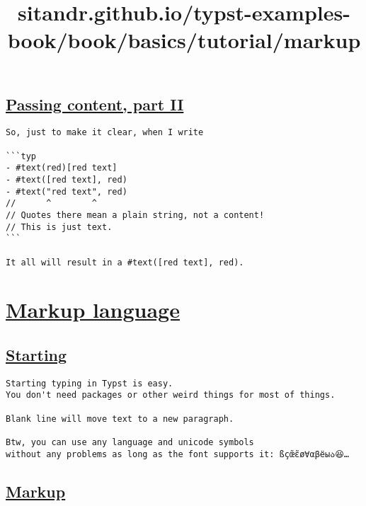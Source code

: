 \pandocbounded{}

\subsection{\texorpdfstring{\hyperref[passing-content-part-ii]{Passing
content, part
II}}{Passing content, part II}}\label{passing-content-part-ii}

\begin{verbatim}
So, just to make it clear, when I write

```typ
- #text(red)[red text]
- #text([red text], red)
- #text("red text", red)
//      ^        ^
// Quotes there mean a plain string, not a content!
// This is just text.
```

It all will result in a #text([red text], red).
\end{verbatim}

\pandocbounded{}


\title{sitandr.github.io/typst-examples-book/book/basics/tutorial/markup}

\section{\texorpdfstring{\hyperref[markup-language]{Markup
language}}{Markup language}}\label{markup-language}

\subsection{\texorpdfstring{\hyperref[starting]{Starting}}{Starting}}\label{starting}

\begin{verbatim}
Starting typing in Typst is easy.
You don't need packages or other weird things for most of things.

Blank line will move text to a new paragraph.

Btw, you can use any language and unicode symbols
without any problems as long as the font supports it: ßçœ̃ɛ̃ø∀αβёыა😆…
\end{verbatim}

\pandocbounded{}

\subsection{\texorpdfstring{\hyperref[markup]{Markup}}{Markup}}\label{markup}


